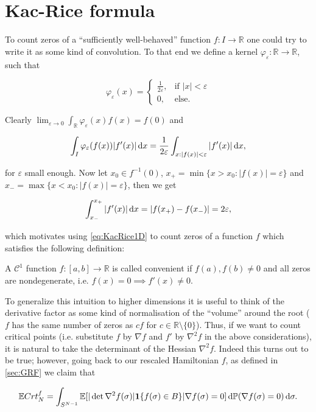 \section{Kac-Rice formula}
To count zeros of a ``sufficiently well-behaved'' function $f:I\rightarrow\mathbb R$ one could try to write it as some kind of convolution. To that end we define a kernel $\varphi_\varepsilon:\mathbb R\rightarrow\mathbb R$, such that

$$
\varphi_\varepsilon(x) = \begin{cases}
	\frac{1}{2\varepsilon}, &\mbox{if } |x|<\varepsilon \\
		0, &\mbox{else.}
\end{cases}$$

Clearly $\lim_{\varepsilon\rightarrow 0}\int_\mathbb{R}\varphi_\varepsilon(x)f(x)=f(0)$ and 

\begin{equation}\label{eq:KacRice1D}
	\int_I \varphi_\varepsilon(f(x))|f'(x)|\mathop{}\!\mathrm{d} x = \frac{1}{2\varepsilon}\int_{x:|f(x)|<\varepsilon}|f'(x)|\mathop{}\!\mathrm{d} x,
\end{equation}

for $\varepsilon$ small enough. Now let $x_0\in f^{-1}(0)$, $x_+=\min\{x>x_0: |f(x)|=\varepsilon\}$ and $x_-=\max\{x<x_0: |f(x)|=\varepsilon\}$, then we get

$$\int_{x_-}^{x_+}|f'(x)|\mathop{}\!\mathrm{d} x = |f(x_+)-f(x_-)|=2\varepsilon,$$

which motivates using \ref{eq:KacRice1D} to count zeros of a function $f$ which satisfies the following definition:
\begin{definition}
	A $\mathcal C^1$ function $f:[a,b]\rightarrow\mathbb R$ is called convenient if $f(a),f(b)\neq 0$ and all zeros are nondegenerate, i.e. $f(x)=0\implies f'(x)\neq 0$.
\end{definition}

To generalize this intuition to higher dimensions it is useful to think of the derivative factor as some kind of normalisation of the ``volume'' around the root ($f$ has the same number of zeros as $cf$ for $c\in\mathbb R\setminus\{0\}$). Thus, if we want to count critical points (i.e. substitute $f$ by $\nabla f$ and $f'$ by $\nabla^2 f$ in the above considerations), it is natural to take the determinant of the Hessian $\nabla^2 f$. Indeed this turns out to be true; however, going back to our rescaled Hamiltonian $f$, as defined in \ref{sec:GRF} we claim that

\begin{equation}\label{eq:KacRiceSN}
	\mathbb E Crt_N^f = \int_{S^{N-1}}\mathbb E[|\det\nabla^2f(\sigma)|\mathbf 1\{f(\sigma)\in B\}|\nabla f(\sigma)=0]\mathop{}\!\mathrm{d}\mathbb P(\nabla f(\sigma)=0)\mathop{}\!\mathrm{d}\sigma.
\end{equation}

